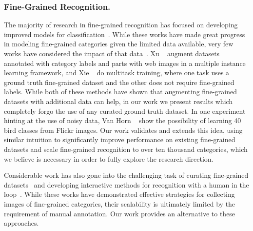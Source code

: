 \documentclass[runningheads]{llncs}
\begin{document}
\subsubsection{Fine-Grained Recognition.}
The majority of research in fine-grained recognition has focused on developing improved models for classification~\cite{angelova2013image,berg2013poof,branson2014bird,chai2011bicos,chai2012tricos,chai2013symbiotic,deng2013fine,duan2012discovering,farrell2011birdlets,gavves2013fine,gavves2014local,goering2014nonparametric,krause2014icpr,krause2015fine,lin2015bilinear,liu2012dog,nilsback2006visual,pu2014looks,shih2015part,simon14pdd,simon2015neural,xiao2015application,xie2014hyper,xu2015augmenting,yang2012unsupervised,yao2011combining,yao2012codebook,zhang2012pose,zhang2013deformable,zhang2014part,zhang2015weakly}.
While these works have made great progress in modeling fine-grained categories given the limited data available, very few works have considered the impact of that data~\cite{xu2015augmenting,xie2014hyper,horn2015}.
Xu \etal~\cite{xu2015augmenting} augment datasets annotated with category labels and parts with web images in a multiple instance learning framework, and Xie \etal~\cite{xie2014hyper} do multitask training, where one task uses a ground truth fine-grained dataset and the other does not require fine-grained labels.
While both of these methods have shown that augmenting fine-grained datasets with additional data can help, in our work we present results which completely forgo the use of any curated ground truth dataset.
In one experiment hinting at the use of noisy data, Van Horn \etal~\cite{horn2015} show the possibility of learning 40 bird classes from Flickr images.
Our work validates and extends this idea, using similar intuition to significantly improve performance on existing fine-grained datasets and scale fine-grained recognition to over ten thousand categories, which we believe is necessary in order to fully explore the research direction.

Considerable work has also gone into the challenging task of curating fine-grained datasets~\cite{bergbirdsnapcvpr2014,horn2015,khosla2011novel,krause20133d,kumar2012leafsnap,mahendran14understanding,welinderetal2010,wahcub2002011,yang2015large} and developing interactive methods for recognition with a human in the loop~\cite{branson2014ignorant,wah2011multiclass,wah2013attribute,wah2014similarity}.
While these works have demonstrated effective strategies for collecting images of fine-grained categories, their scalability is ultimately limited by the requirement of manual annotation.
Our work provides an alternative to these approaches.
\end{document}
